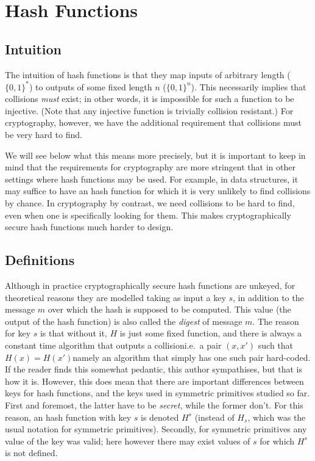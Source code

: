 
\chapter{Hash Functions}
\label{cha:hashfunctions}

\section{Intuition}
  \label{sec:hashfunc_intuition}
  The intuition of hash functions is that they map inputs of arbitrary length ($\{0, 1\}^*$) to outputs of some fixed length $n$ ($\{0, 1\}^n$). This necessarily implies that collisions \emph{must} exist; in other words, it is impossible for such a function to be injective. (Note that any injective function is trivially collision resistant.) For cryptography, however, we have the additional requirement that collisions must be very hard to find.

  We will see below what this means more precisely, but it is important to keep in mind that the requirements for cryptography are more stringent that in other settings where hash functions may be used. For example, in data structures, it may suffice to have an hash function for which it is very unlikely to find collisions by chance. In cryptography by contrast, we need collisions to be hard to find, even when one is specifically looking for them. This makes cryptographically secure hash functions much harder to design.

\section{Definitions}
  \label{sec:hashunc_definitions}
  Although in practice cryptographically secure hash functions are unkeyed, for theoretical reasons they are modelled taking as input a key $s$, in addition to the message $m$ over which the hash is supposed to be computed. This value (the output of the hash function) is also called the \emph{digest} of message $m$. The reason for key $s$ is that without it, $H$ is just some fixed function, and there is always a constant time algorithm that outputs a collision\emd i.e.\ a pair $(x, x')$ such that $H(x) = H(x')$\emd namely an algorithm that simply has one such pair hard-coded. If the reader finds this somewhat pedantic, this author sympathises, but that is how it is. However, this does mean that there are important differences between keys for hash functions, and the keys used in symmetric primitives studied so far. First and foremost, the latter have to be \emph{secret}, while the former don't. For this reason, an hash function with key $s$ is denoted $H^s$ (instead of $H_s$, which was the usual notation for symmetric primitives). Secondly, for symmetric primitives any value of the key was valid; here however there may exist values of $s$ for which $H^s$ is not defined.

